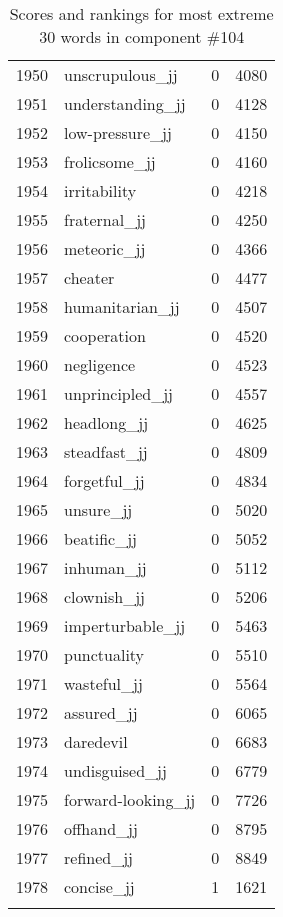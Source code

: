 \begin{longtable}[!htbp]{| rlr@{.}l |}
    1950 & unscrupulous\_jj & 0 & 4080 \\
    1951 & understanding\_jj & 0 & 4128 \\
    1952 & low-pressure\_jj & 0 & 4150 \\
    1953 & frolicsome\_jj & 0 & 4160 \\
    1954 & irritability & 0 & 4218 \\
    1955 & fraternal\_jj & 0 & 4250 \\
    1956 & meteoric\_jj & 0 & 4366 \\
    1957 & cheater & 0 & 4477 \\
    1958 & humanitarian\_jj & 0 & 4507 \\
    1959 & cooperation & 0 & 4520 \\
    1960 & negligence & 0 & 4523 \\
    1961 & unprincipled\_jj & 0 & 4557 \\
    1962 & headlong\_jj & 0 & 4625 \\
    1963 & steadfast\_jj & 0 & 4809 \\
    1964 & forgetful\_jj & 0 & 4834 \\
    1965 & unsure\_jj & 0 & 5020 \\
    1966 & beatific\_jj & 0 & 5052 \\
    1967 & inhuman\_jj & 0 & 5112 \\
    1968 & clownish\_jj & 0 & 5206 \\
    1969 & imperturbable\_jj & 0 & 5463 \\
    1970 & punctuality & 0 & 5510 \\
    1971 & wasteful\_jj & 0 & 5564 \\
    1972 & assured\_jj & 0 & 6065 \\
    1973 & daredevil & 0 & 6683 \\
    1974 & undisguised\_jj & 0 & 6779 \\
    1975 & forward-looking\_jj & 0 & 7726 \\
    1976 & offhand\_jj & 0 & 8795 \\
    1977 & refined\_jj & 0 & 8849 \\
    1978 & concise\_jj & 1 & 1621 \\
    \hline
    \caption{Scores and rankings for most extreme 30 words in component \#104} \\
\end{longtable}
